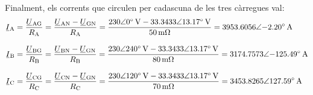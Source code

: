 \begin{exemple}
    Finalment, els corrents que circulen per cadascuna de les tres càrregues val:
    \begin{align*}
    \cmplx{I}\ped{A} &= \frac{\cmplx{U}\ped{AG}}{R\ped{A}} = \frac{\cmplx{U}\ped{AN} - \cmplx{U}\ped{GN}}{R\ped{A}} = \frac{\complexqty{230:0}{V}-\complexqty{33,3433:13,17}{V}}{\qty{50}{m\ohm}}
    = \complexqty{3953,6056:-2,20}{A}\\[2ex]
    \cmplx{I}\ped{B} &= \frac{\cmplx{U}\ped{BG}}{R\ped{B}} = \frac{\cmplx{U}\ped{BN} - \cmplx{U}\ped{GN}}{R\ped{B}} = \frac{\complexqty{230:240}{V}-\complexqty{33,3433:13,17}{V}}{\qty{80}{m\ohm}}
    = \complexqty{3174,7573:-125,49}{A}\\[2ex]
    \cmplx{I}\ped{C} &= \frac{\cmplx{U}\ped{CG}}{R\ped{C}} = \frac{\cmplx{U}\ped{CN} - \cmplx{U}\ped{GN}}{R\ped{C}} = \frac{\complexqty{230:120}{V}-\complexqty{33,3433:13,17}{V}}{\qty{70}{m\ohm}}
    = \complexqty{3453,8265:127,59}{A}
    \end{align*}
\end{exemple}

